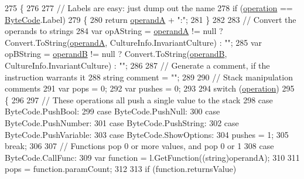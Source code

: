 \begin{DoxyCode}
275         \{
276 
277             \textcolor{comment}{// Labels are easy: just dump out the name}
278             \textcolor{keywordflow}{if} (\hyperlink{a00121_a566bf5f7198cc353ea5c3710cb3a31cb}{operation} == \hyperlink{a00053_ad5dfb6ee68ca7469623ad3e459f98894}{ByteCode}.Label)
279             \{
280                 \textcolor{keywordflow}{return} \hyperlink{a00121_ab5d386faa0d3dbc23db80f8e62706afd}{operandA} + \textcolor{stringliteral}{":"};
281             \}
282 
283             \textcolor{comment}{// Convert the operands to strings}
284             var opAString = \hyperlink{a00121_ab5d386faa0d3dbc23db80f8e62706afd}{operandA} != null ? Convert.ToString(\hyperlink{a00121_ab5d386faa0d3dbc23db80f8e62706afd}{operandA}, 
      CultureInfo.InvariantCulture) : \textcolor{stringliteral}{""};
285             var opBString = \hyperlink{a00121_a56348c6fe7eb919b7277afc06e5b224a}{operandB} != null ? Convert.ToString(\hyperlink{a00121_a56348c6fe7eb919b7277afc06e5b224a}{operandB}, 
      CultureInfo.InvariantCulture) : \textcolor{stringliteral}{""};
286 
287             \textcolor{comment}{// Generate a comment, if the instruction warrants it}
288             \textcolor{keywordtype}{string} comment = \textcolor{stringliteral}{""};
289 
290             \textcolor{comment}{// Stack manipulation comments}
291             var pops = 0;
292             var pushes = 0;
293 
294             \textcolor{keywordflow}{switch} (\hyperlink{a00121_a566bf5f7198cc353ea5c3710cb3a31cb}{operation})
295             \{
296 
297                 \textcolor{comment}{// These operations all push a single value to the stack}
298                 \textcolor{keywordflow}{case} ByteCode.PushBool:
299                 \textcolor{keywordflow}{case} ByteCode.PushNull:
300                 \textcolor{keywordflow}{case} ByteCode.PushNumber:
301                 \textcolor{keywordflow}{case} ByteCode.PushString:
302                 \textcolor{keywordflow}{case} ByteCode.PushVariable:
303                 \textcolor{keywordflow}{case} ByteCode.ShowOptions:
304                     pushes = 1;
305                     \textcolor{keywordflow}{break};
306 
307                 \textcolor{comment}{// Functions pop 0 or more values, and pop 0 or 1}
308                 \textcolor{keywordflow}{case} ByteCode.CallFunc:
309                     var \textcolor{keyword}{function} = l.GetFunction((string)operandA);
310 
311                     pops = function.paramCount;
312 
313                     \textcolor{keywordflow}{if} (\textcolor{keyword}{function}.returnsValue)

\end{DoxyCode}
